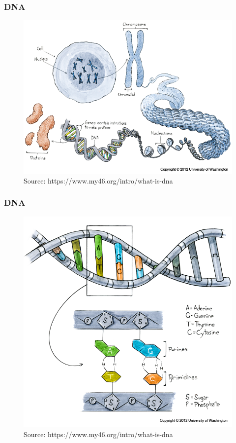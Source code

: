 \documentclass{beamer}
\begin{document}
		\begin{frame} \frametitle{DNA}
		\begin{figure}[hbtp]
			\centering
			\includegraphics[scale=0.42]{img/dna01.png}
			\caption{\tiny{Source: https://www.my46.org/intro/what-is-dna}}
		\end{figure}
		\end{frame}	
	
		\begin{frame} \frametitle{DNA}
		\begin{figure}[hbtp]
			\centering
			\includegraphics[scale=0.3]{img/dna02.png}
			\caption{\tiny{Source: https://www.my46.org/intro/what-is-dna}}
		\end{figure}
		\end{frame}	
	
\end{document}
